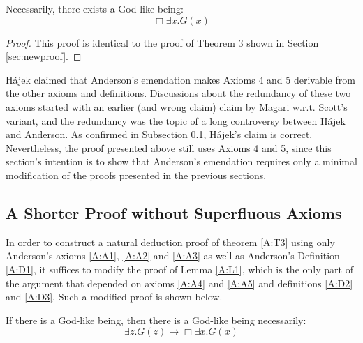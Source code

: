 \documentclass[smallextended]{svjour3}
\newcommand{\imp}{\rightarrow}
\newcommand{\ex}{\exists}
\newcommand{\nec}{\Box} %
\begin{document}
\setcounter{theorem}{2}
\begin{theorem}
\label{A:T3}
Necessarily, there exists a God-like being:
$$
\nec \ex x. G(x)
$$
\end{theorem}
\begin{proof}
This proof is identical to the proof of Theorem 3 shown in Section \ref{sec:newproof}.
\end{proof}


H\'ajek \citep{hajek} claimed that Anderson's emendation makes Axioms 4 and 5 derivable from the other axioms and definitions. Discussions about the redundancy of these two axioms started with an earlier (and wrong claim) claim by Magari \citep{magari} w.r.t. Scott's variant, and the redundancy was the topic of a long controversy \citep{controversy} between H\'ajek and Anderson. As confirmed in Subsection \ref{sec:NonRedundantAnderson}, H\'ajek's claim is correct. Nevertheless, the proof presented above still uses Axioms 4 and 5, since this section's intention is to show that Anderson's emendation requires only a minimal modification of the proofs presented in the previous sections.

\subsection{A Shorter Proof without Superfluous Axioms}
\label{sec:NonRedundantAnderson}


\setcounter{axiom}{0}
\setcounter{lemma}{0}
\setcounter{theorem}{0}
\setcounter{corollary}{0}
\setcounter{definition}{0}

In order to construct a natural deduction proof of theorem \ref{A:T3} using only Anderson's axioms \ref{A:A1}, \ref{A:A2} and \ref{A:A3} as well as Anderson's Definition \ref{A:D1}, it suffices to modify 
the proof of Lemma \ref{A:L1}, which is the only part of the argument that depended on axioms \ref{A:A4} and \ref{A:A5} and definitions \ref{A:D2} and \ref{A:D3}. Such a modified proof is shown below. 


\begin{lemma}
\label{A2:L1}
If there is a God-like being, then there is a God-like being necessarily:
$$
\ex z. G(z) \imp \nec \ex x. G(x)
$$
\end{lemma}
\end{document}
